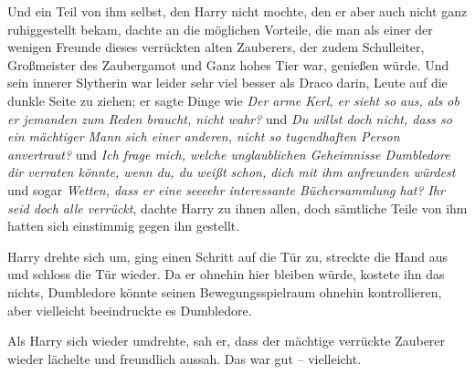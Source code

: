 Und ein Teil von ihm selbst, den Harry nicht mochte, den er aber auch nicht ganz ruhiggestellt bekam, dachte an die möglichen Vorteile, die man als einer der wenigen Freunde dieses verrückten alten Zauberers, der zudem Schulleiter, Großmeister des Zaubergamot und Ganz hohes Tier war, genießen würde. Und sein innerer Slytherin war leider sehr viel besser als Draco darin, Leute auf die dunkle Seite zu ziehen; er sagte Dinge wie \emph{Der arme Kerl, er sieht so aus, als ob er jemanden zum Reden braucht, nicht wahr?} und \emph{Du willst doch nicht, dass so ein mächtiger Mann sich einer anderen, nicht so tugendhaften Person anvertraut?} und \emph{Ich frage mich, welche unglaublichen Geheimnisse Dumbledore dir verraten könnte, wenn du, du weißt schon, dich mit ihm anfreunden würdest} und sogar \emph{Wetten, dass er eine seeeehr interessante Büchersammlung hat?}
\emph{Ihr seid doch alle verrückt}, dachte Harry zu ihnen allen, doch sämtliche Teile von ihm hatten sich einstimmig gegen ihn gestellt.

Harry drehte sich um, ging einen Schritt auf die Tür zu, streckte die Hand aus und schloss die Tür wieder. Da er ohnehin hier bleiben würde, kostete ihn das nichts, Dumbledore könnte seinen Bewegungsspielraum ohnehin kontrollieren, aber vielleicht beeindruckte es Dumbledore.

Als Harry sich wieder umdrehte, sah er, dass der mächtige verrückte Zauberer wieder lächelte und freundlich aussah. Das war gut – vielleicht.

